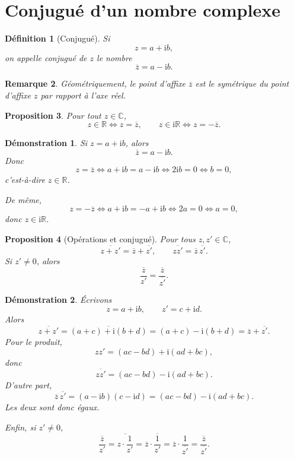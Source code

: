 \documentclass[11pt,a4paper]{article}
\newtheorem{definition}{Définition}[section]
\newtheorem{proposition}[definition]{Proposition}
\newtheorem{remarque}[definition]{Remarque}
\newtheorem*{demonstration}{Démonstration}
\newcommand{\R}{\mathbb{R}}
\newcommand{\C}{\mathbb{C}}
\newcommand{\ii}{\mathrm{i}}
\begin{document}
\section{Conjugué d'un nombre complexe}

\begin{definition}[Conjugué]
Si
\[
z=a+\ii b,
\]
on appelle \emph{conjugué} de $z$ le nombre
\[
\overline{z}=a-\ii b.
\]
\end{definition}

\begin{remarque}
Géométriquement, le point d'affixe $\overline{z}$ est le symétrique du point d'affixe $z$ par rapport à l'axe réel.
\end{remarque}

\begin{proposition}
Pour tout $z\in \C$,
\[
z\in \R \iff z=\overline{z},
\qquad
z\in \ii\R \iff z=-\overline{z}.
\]
\end{proposition}

\begin{demonstration}
Si $z=a+\ii b$, alors
\[
\overline{z}=a-\ii b.
\]
Donc
\[
z=\overline{z}
\iff a+\ii b=a-\ii b
\iff 2\ii b=0
\iff b=0,
\]
c'est-à-dire $z\in \R$.

De même,
\[
z=-\overline{z}
\iff a+\ii b=-a+\ii b
\iff 2a=0
\iff a=0,
\]
donc $z\in \ii\R$.
\end{demonstration}

\begin{proposition}[Opérations et conjugué]
Pour tous $z,z'\in \C$,
\[
\overline{z+z'}=\overline{z}+\overline{z'},
\qquad
\overline{zz'}=\overline{z}\,\overline{z'}.
\]
Si $z'\neq 0$, alors
\[
\overline{\frac{z}{z'}}=\frac{\overline{z}}{\overline{z'}}.
\]
\end{proposition}

\begin{demonstration}
Écrivons
\[
z=a+\ii b,\qquad z'=c+\ii d.
\]
Alors
\[
\overline{z+z'}=\overline{(a+c)+\ii(b+d)}=(a+c)-\ii(b+d)
=\overline{z}+\overline{z'}.
\]
Pour le produit,
\[
zz'=(ac-bd)+\ii(ad+bc),
\]
donc
\[
\overline{zz'}=(ac-bd)-\ii(ad+bc).
\]
D'autre part,
\[
\overline{z}\,\overline{z'}=(a-\ii b)(c-\ii d)=(ac-bd)-\ii(ad+bc).
\]
Les deux sont donc égaux.

Enfin, si $z'\neq 0$,
\[
\overline{\frac{z}{z'}}=\overline{z\cdot \frac1{z'}}=\overline{z}\cdot \overline{\frac1{z'}}
=\overline{z}\cdot \frac1{\overline{z'}}
=\frac{\overline{z}}{\overline{z'}}.
\]
\end{demonstration}
\end{document}
